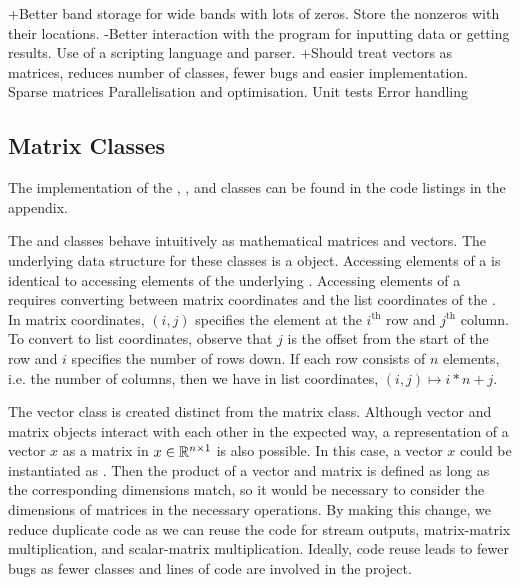 +Better band storage for wide bands with lots of zeros. Store the nonzeros with their locations.
-Better interaction with the program for inputting data or getting results. Use of a scripting language and parser. 
+Should treat vectors as matrices, reduces number of classes, fewer bugs and easier implementation.
Sparse matrices
Parallelisation and optimisation.
Unit tests
Error handling
\fi

\subsection{Matrix Classes}

The implementation of the , , and  classes can be found in the code listings in the appendix.

The  and  classes behave intuitively as mathematical matrices and vectors. 
The underlying data structure for these classes is a  object.
Accessing elements of a  is identical to accessing elements of the underlying .
Accessing elements of a  requires converting between matrix coordinates and the list coordinates of the .
In matrix coordinates, $(i,j)$ specifies the element at the $i^\mathrm{th}$ row and $j^\mathrm{th}$ column.
To convert to list coordinates, observe that $j$ is the offset from the start of the row and $i$ specifies the number of rows down.
If each row consists of $n$ elements, i.e. the number of columns, then we have in list coordinates, $(i,j) \mapsto i*n + j$.


The vector class is created distinct from the matrix class.
Although vector and matrix objects interact with each other in the expected way, a representation of a vector $x$ as a matrix in $x\in\mathbb{R}^{n\times 1}$ is also possible.
In this case, a vector $x$ could be instantiated as .
Then the product of a vector and matrix is defined as long as the corresponding dimensions match, so it would be necessary to consider the dimensions of matrices in the necessary operations.
By making this change, we reduce duplicate code as we can reuse the code for stream outputs, matrix-matrix multiplication, and scalar-matrix multiplication.
Ideally, code reuse leads to fewer bugs as fewer classes and lines of code are involved in the project.


